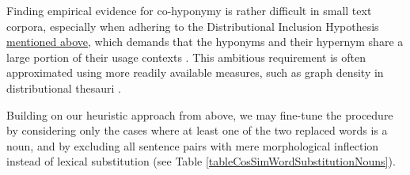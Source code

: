 Finding empirical evidence for co-hyponymy is rather difficult in small text corpora, especially when adhering to the Distributional Inclusion Hypothesis \hyperref[distributionalInclusionHypothesis]{mentioned above}, which demands that the hyponyms and their hypernym share a large portion of their usage contexts \parencite[110]{geffetDistributionalInclusionHypotheses2005}. This ambitious requirement is often approximated using more readily available measures, such as graph density in distributional thesauri \parencites[2]{janaNetworkFeaturesBased2018}[4]{janaUsingDistributionalThesaurus2020}.

Building on our heuristic approach from above, we may fine-tune the procedure by considering only the cases where at least one of the two replaced words is a noun, and by excluding all sentence pairs with mere morphological inflection instead of lexical substitution (see Table \ref{tableCosSimWordSubstitutionNouns}). 


